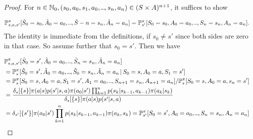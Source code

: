 \begin{proof}
    For \(  n  \in \mathbb{N}_{0}, (s_{0},a_{0},s_{1},a_{0},\kern-0.10em.\kern-0.06em.\kern-0.06em.\kern-0.1em,s_n,a_n) \in (S\times A)^{n+1} \), it suffices to show

    \[
        \mathbb{P}_{s,a,s'}^\pi [ \hat{S}_0 = s_{0}, \hat{A}_{0} = a_{0}, \kern-0.10em.\kern-0.06em.\kern-0.06em.\kern-0.1em, \hat{S}-n = s_n, \hat{A}_n = a_n] = \mathbb{P}_{s'}^\pi [S_0 = s_{0}, A_{0} = a_{0}, \kern-0.10em.\kern-0.06em.\kern-0.06em.\kern-0.1em, S_n = s_n, A_n = a_n].
    \]
    The identity is immediate from the definitions, if \( s_{0} \neq s' \) since both sides are zero in that case. So assume further that \( s_{0} = s' \).  
    Then we have

    \begin{align*}
        &\mathbb{P}_{s,a,s'}^\pi[\hat{S}_0 = s', \hat{A}_{0} = a_{0}, \kern-0.10em.\kern-0.06em.\kern-0.06em.\kern-0.1em, \hat{S}_n = s_n, \hat{A}_n = a_n] \\
        &= \mathbb{P}_s^\pi[ \hat{S}_{0} = s', \hat{A}_{0} = a_{0}, \kern-0.10em.\kern-0.06em.\kern-0.06em.\kern-0.1em, \hat{S}_{0} = s_n, \hat{A}_n = a_n \,|\, S_{0} = s, A_{0} = a, S_{1} = s'] \\
        &= \mathbb{P}_s^\pi [S_{0} =s, A_{0}= a, S_1 = s', A_{1} = a_{0}, \kern-0.10em.\kern-0.06em.\kern-0.06em.\kern-0.1em, S_{n+1} = s_n, A_{n+1} = a_n] / \mathbb{P}_s^\pi[S_0 = s, A_{0} = a, s_n = s']\\
        &= \frac{\delta_s[\left\{ s \right\}] \pi(a|s) p(s' | s,a) \pi(a_{0}|s') \prod_{k=1}^n p(s_k | s_{k-1}, a_{k-1}) \pi(a_k | s_k)}{\delta_s[\left\{ s \right\}] \pi(a | s) p(s' | s,a)} \\
        &= \delta_{s'}[\left\{ s' \right\}] \pi(a_{0} | s') \prod_{k=1}^n p(s_k | s_{k-1}, a_{k-1}) \pi(a_k, s_k) = \mathbb{P}_{s'}^\pi[ S_{0} = s', A_{0} = a_{0}, \kern-0.10em.\kern-0.06em.\kern-0.06em.\kern-0.1em, S_n = s_n, A_n = a_n]\\ 
    \end{align*}
\end{proof}


